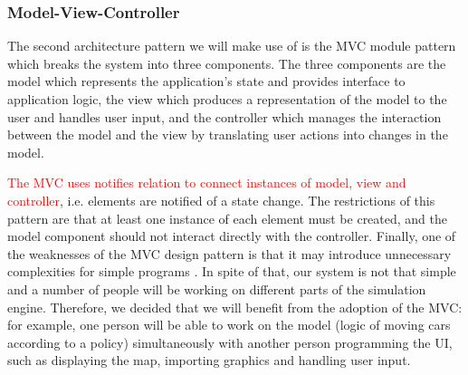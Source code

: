 \documentclass{article}
\begin{document}
\subsubsection{Model-View-Controller}
The second architecture pattern we will make use of is the MVC module pattern which breaks the system into three components. 
The three components are the model which represents the application's state and provides interface to application logic, the view which produces a representation of the model to the user and handles user input, and the controller which manages the interaction between the model and the view by translating user actions into changes in the model. 

\textcolor{red}{The MVC uses notifies relation to connect instances of model, view and controller}, i.e. elements are notified of a state change. 
The restrictions of this pattern are that at least one instance of each element must be created, and the model component should not interact directly with the controller. 
Finally, one of the weaknesses of the MVC design pattern is that it may introduce unnecessary complexities for simple programs \cite{bass2007software}. 
In spite of that, our system is not that simple and a number of people will be working on different parts of the simulation engine. Therefore, we decided that we will benefit from the adoption of the MVC: for example, one person will be able to work on the model (logic of moving cars according to a policy) simultaneously with another person programming the UI, such as displaying the map, importing graphics and handling user input. 
\end{document}
